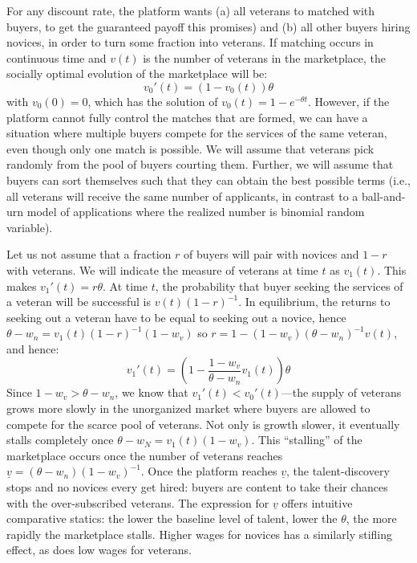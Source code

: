 For any discount rate, the platform wants (a) all veterans to matched
with buyers, to get the guaranteed payoff this promises) and (b) all
other buyers hiring novices, in order to turn some fraction into
veterans. If matching occurs in continuous time and $v(t)$ is the
number of veterans in the marketplace, the socially optimal evolution
of the marketplace will be:
\begin{equation}
v_{0}'(t) = (1-v_0(t))\theta
\end{equation}
with $v_0(0)=0$, which has the solution of $v_0(t) = 1-e^{-\theta
  t}$. However, if the platform cannot fully control the matches that
are formed, we can have a situation where multiple buyers compete for
the services of the same veteran, even though only one match is
possible. We will assume that veterans pick randomly from the pool of
buyers courting them. Further, we will assume that buyers can sort
themselves such that they can obtain the best possible terms (i.e.,
all veterans will receive the same number of applicants, in contrast
to a ball-and-urn model of applications where the realized number is
binomial random variable).

Let us not assume that a fraction $r$ of buyers will pair with novices
and $1-r$ with veterans. We will indicate the measure of veterans at
time $t$ as $v_1(t)$. This makes $v_1'(t) = r\theta$. At time $t$, the
probability that buyer seeking the services of a veteran will be
successful is $v(t) (1-r)^{-1}$. In equilibrium, the returns to
seeking out a veteran have to be equal to seeking out a novice, hence
$\theta - w_n = v_1(t)(1-r)^{-1} (1 - w_v)$ so $r = 1 - (1 -
  w_v)(\theta - w_n)^{-1}v(t)$, and hence: 
\begin{equation}
  v_1'(t) = \left(1 - \frac{1 - w_v}{\theta - w_n}v_1(t)\right)\theta 
\end{equation} 
Since $1 - w_v > \theta - w_n$, we know that $v_1'(t) < v_0'(t)$---the
supply of veterans grows more slowly in the unorganized market where
buyers are allowed to compete for the scarce pool of veterans. Not
only is growth slower, it eventually stalls completely once $\theta -
w_N = v_1(t)(1-w_v)$. This ``stalling'' of the marketplace occurs once
the number of veterans reaches $\underline{v} = (\theta - w_n)(1
  - w_v)^{-1}$. Once the platform reaches $\underline{v}$, the
talent-discovery stops and no novices every get hired: buyers are
content to take their chances with the over-subscribed veterans. The
expression for $\underline{v}$ offers intuitive comparative statics:
the lower the baseline level of talent, lower the $\theta$, the more
rapidly the marketplace stalls. Higher wages for novices has a
similarly stifling effect, as does low wages for veterans.

